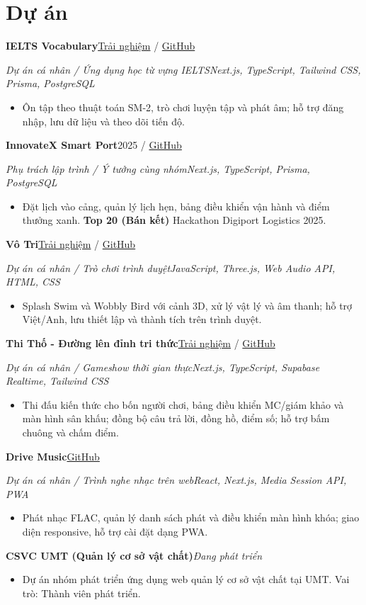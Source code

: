 \documentclass[10pt,a4paper]{article}
\newcommand{\project}[2]{\textbf{#1}\hfill #2\par}
\newcommand{\projectmeta}[2]{{\fontsize{9}{11}\selectfont\itshape #1\hfill #2}\par}
\begin{document}
\section{Dự án}
\project{IELTS Vocabulary}{\href{https://ielts.ungnhutkhang.id.vn/}{Trải nghiệm} / \href{https://github.com/mm4you/ielts}{GitHub}}
\projectmeta{Dự án cá nhân / Ứng dụng học từ vựng IELTS}{Next.js, TypeScript, Tailwind CSS, Prisma, PostgreSQL}
\begin{itemize}
\item Ôn tập theo thuật toán SM-2, trò chơi luyện tập và phát âm; hỗ trợ đăng nhập, lưu dữ liệu và theo dõi tiến độ.
\end{itemize}
\vspace{2pt}
\project{InnovateX Smart Port}{2025 / \href{https://github.com/mm4you/hackathon}{GitHub}}
\projectmeta{Phụ trách lập trình / Ý tưởng cùng nhóm}{Next.js, TypeScript, Prisma, PostgreSQL}
\begin{itemize}
\item Đặt lịch vào cảng, quản lý lịch hẹn, bảng điều khiển vận hành và điểm thưởng xanh. \textbf{Top 20 (Bán kết)} Hackathon Digiport Logistics 2025.
\end{itemize}
\vspace{2pt}
\project{Vô Tri}{\href{https://votrihub.vercel.app/}{Trải nghiệm} / \href{https://github.com/mm4you/votri}{GitHub}}
\projectmeta{Dự án cá nhân / Trò chơi trình duyệt}{JavaScript, Three.js, Web Audio API, HTML, CSS}
\begin{itemize}
\item Splash Swim và Wobbly Bird với cảnh 3D, xử lý vật lý và âm thanh; hỗ trợ Việt/Anh, lưu thiết lập và thành tích trên trình duyệt.
\end{itemize}
\vspace{2pt}
\project{Thi Thố - Đường lên đỉnh tri thức}{\href{https://thitho.vercel.app/}{Trải nghiệm} / \href{https://github.com/mm4you/thitho}{GitHub}}
\projectmeta{Dự án cá nhân / Gameshow thời gian thực}{Next.js, TypeScript, Supabase Realtime, Tailwind CSS}
\begin{itemize}
\item Thi đấu kiến thức cho bốn người chơi, bảng điều khiển MC/giám khảo và màn hình sân khấu; đồng bộ câu trả lời, đồng hồ, điểm số; hỗ trợ bấm chuông và chấm điểm.
\end{itemize}
\vspace{2pt}
\project{Drive Music}{\href{https://github.com/mm4you/drive-music}{GitHub}}
\projectmeta{Dự án cá nhân / Trình nghe nhạc trên web}{React, Next.js, Media Session API, PWA}
\begin{itemize}
\item Phát nhạc FLAC, quản lý danh sách phát và điều khiển màn hình khóa; giao diện responsive, hỗ trợ cài đặt dạng PWA.
\end{itemize}
\vspace{2pt}
\project{CSVC UMT (Quản lý cơ sở vật chất)}{\textit{Đang phát triển}}
\begin{itemize}
\item Dự án nhóm phát triển ứng dụng web quản lý cơ sở vật chất tại UMT. Vai trò: Thành viên phát triển.
\end{itemize}
\end{document}
